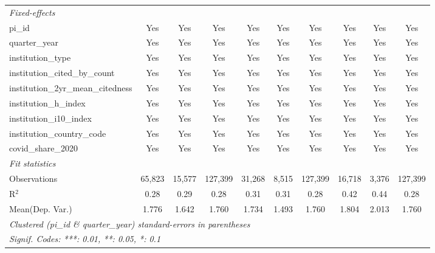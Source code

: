 \begin{tabular}{lccccccccc}
   \midrule
   \emph{Fixed-effects}\\
   pi\_id                                                      & Yes            & Yes            & Yes           & Yes            & Yes            & Yes           & Yes            & Yes            & Yes\\  
   quarter\_year                                               & Yes            & Yes            & Yes           & Yes            & Yes            & Yes           & Yes            & Yes            & Yes\\  
   institution\_type                                           & Yes            & Yes            & Yes           & Yes            & Yes            & Yes           & Yes            & Yes            & Yes\\  
   institution\_cited\_by\_count                               & Yes            & Yes            & Yes           & Yes            & Yes            & Yes           & Yes            & Yes            & Yes\\  
   institution\_2yr\_mean\_citedness                           & Yes            & Yes            & Yes           & Yes            & Yes            & Yes           & Yes            & Yes            & Yes\\  
   institution\_h\_index                                       & Yes            & Yes            & Yes           & Yes            & Yes            & Yes           & Yes            & Yes            & Yes\\  
   institution\_i10\_index                                     & Yes            & Yes            & Yes           & Yes            & Yes            & Yes           & Yes            & Yes            & Yes\\  
   institution\_country\_code                                  & Yes            & Yes            & Yes           & Yes            & Yes            & Yes           & Yes            & Yes            & Yes\\  
   covid\_share\_2020                                          & Yes            & Yes            & Yes           & Yes            & Yes            & Yes           & Yes            & Yes            & Yes\\  
   \midrule
   \emph{Fit statistics}\\
   Observations                                                & 65,823         & 15,577         & 127,399       & 31,268         & 8,515          & 127,399       & 16,718         & 3,376          & 127,399\\  
   R$^2$                                                       & 0.28           & 0.29           & 0.28          & 0.31           & 0.31           & 0.28          & 0.42           & 0.44           & 0.28\\  
Mean(Dep. Var.) & 1.776 & 1.642 & 1.760 & 1.734 & 1.493 & 1.760 & 1.804 & 2.013 & 1.760 \\
   \midrule \midrule
   \multicolumn{10}{l}{\emph{Clustered (pi\_id \& quarter\_year) standard-errors in parentheses}}\\
   \multicolumn{10}{l}{\emph{Signif. Codes: ***: 0.01, **: 0.05, *: 0.1}}\\
\end{tabular}
\par\endgroup
